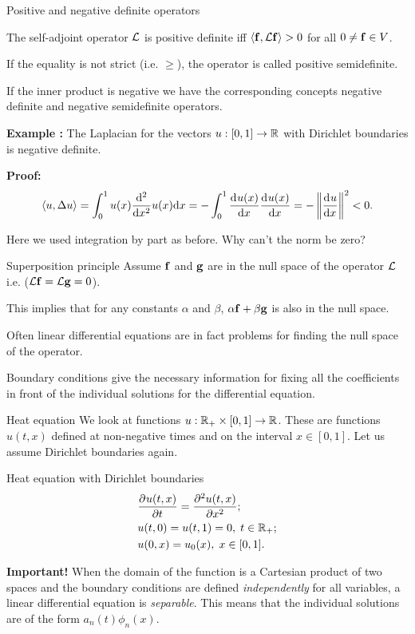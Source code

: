 \begin{frame}{Positive and negative definite operators}
	\begin{mydefinition}
		The self-adjoint operator $ \opone $ is \alert{positive definite} iff $ \iprod{\fone}{\opone \fone} > 0 $ for all $ 0 \neq \fone \in V $.
	\end{mydefinition}
	If the equality is not strict (i.e. $ \geq $), the operator is called \alert{positive semidefinite}. 
	
	\pause
	If the inner product is negative we have the corresponding concepts \alert{negative definite} and \alert{negative semidefinite} operators.
	
	\pause
	\textbf{Example \examplen :} The Laplacian for the vectors $ u: [0,1] \to \R $ with Dirichlet boundaries is negative definite. 
	
	\pause
	\textbf{Proof:} 
	\[ \iprod{u}{\Delta u} = \int_{0}^{1} u(x) \dd[2]{}{x} u(x) \diff x = -\int_{0}^{1} \dd{u(x)}{x} \dd{u(x)}{x} = -\norm{\dd{u}{x}}^2 < 0. \]
	
	Here we used integration by part as before. Why can't the norm be zero?
\end{frame}

\begin{frame}{Superposition principle}
	Assume $ \fone $ and $ \ftwo $ are in the null space of the operator $ \opone $ i.e. ($ \opone \fone = \opone \ftwo = 0 $). 
	
	\pause
	This implies that for any constants $ \alpha $ and $ \beta  $, $ \alpha \fone + \beta \ftwo  $ is also in the null space. 
	
	\pause
	Often linear differential equations are in fact problems for finding the null space of the operator. 
	
	\pause
	Boundary conditions give the necessary information for fixing all the coefficients in front of the individual solutions for the differential equation.
\end{frame}

\begin{frame}{Heat equation}
	We look at functions $ u: \R_{+} \times [0,1] \to \R $. These are functions $ u(t,x) $ defined at non-negative times and on the interval $x \in  [0,1] $. Let us assume Dirichlet boundaries again.
	
	\pause
	\begin{block}{\centering Heat equation with Dirichlet boundaries}
		\begin{align*}
			&\pfrac{u(t,x)}{t} = \pfrac[2]{u(t,x)}{x}; \\
			&u(t,0) = u(t,1) = 0,\; t \in \R_{+}; \\
			&u(0,x) = u_0(x), \; x \in [0,1].
		\end{align*}
	\end{block}
	
	\pause
	\textbf{Important!} When the domain of the function is a Cartesian product of two spaces and the boundary conditions are defined \emph{independently} for all variables, a linear differential equation is \emph{separable}. This means that the individual solutions are of the form $ a_n (t) \phi_n (x) $.
\end{frame}

